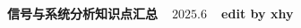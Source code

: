 \documentclass[10pt,a4paper]{article}
\begin{document}

\scriptsize
\begin{multicols*}{4}
\centerline{\textbf{信号与系统分析知识点汇总~~$2025.6$~~edit by xhy}}
\fontsize{6pt}{7pt}

\end{multicols*}
\end{document}
